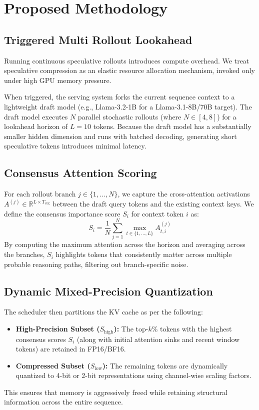 \documentclass[10pt,twocolumn,letterpaper]{article}
\begin{document}
\section{Proposed Methodology}

\subsection{Triggered Multi Rollout Lookahead}
Running continuous speculative rollouts introduces compute overhead. We treat speculative compression as an elastic resource allocation mechanism, invoked only under high GPU memory pressure.

When triggered, the serving system forks the current sequence context to a lightweight draft model (e.g., Llama-3.2-1B for a Llama-3.1-8B/70B target). The draft model executes $N$ parallel stochastic rollouts (where $N \in [4, 8]$) for a lookahead horizon of $L = 10$ tokens. Because the draft model has a substantially smaller hidden dimension and runs with batched decoding, generating short speculative tokens introduces minimal latency.

\subsection{Consensus Attention Scoring}
For each rollout branch $j \in \{1, \dots, N\}$, we capture the cross-attention activations $A^{(j)} \in \mathbb{R}^{L \times T_{\text{ctx}}}$ between the draft query tokens and the existing context keys. We define the consensus importance score $S_i$ for context token $i$ as:
\begin{equation}
S_i = \frac{1}{N} \sum_{j=1}^N \max_{t \in \{1, \dots, L\}} A^{(j)}_{t, i}
\end{equation}
By computing the maximum attention across the horizon and averaging across the branches, $S_i$ highlights tokens that consistently matter across multiple probable reasoning paths, filtering out branch-specific noise.

\subsection{Dynamic Mixed-Precision Quantization}
The scheduler then partitions the KV cache as per the following:
\begin{itemize}
    \item \textbf{High-Precision Subset ($S_{\text{high}}$):} The top-$k\%$ tokens with the highest consensus scores $S_i$ (along with initial attention sinks and recent window tokens) are retained in FP16/BF16.
    \item \textbf{Compressed Subset ($S_{\text{low}}$):} The remaining tokens are dynamically quantized to 4-bit or 2-bit representations using channel-wise scaling factors.
\end{itemize}
This ensures that memory is aggressively freed while retaining structural information across the entire sequence.


\end{document}
